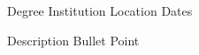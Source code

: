 

\begin{cventries}

  \cventry
    {Degree} %
    {Institution} %
    {Location} %
    {Dates} %
    {
      \begin{cvitems} %
        \item {Description Bullet Point}
      \end{cvitems}
    }


\end{cventries}
